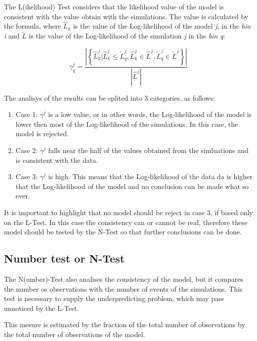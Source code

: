 The L(ikelihood) Test considers that the likelihood value of the model
is consistent with the value obtain with the simulations. The value is
calculated by the formula, where $\widehat{L}_k$ is the value of the
Log-likelihood of the model {\it j}, in the {\it bin} {\it i} and
$\widetilde{L}$ is the value of the Log-likelihood of the simulation
{\it j} in the {\it bin} {\it q}:


\begin{equation}
\gamma^{j}_{q} = \frac{\left| \left\{ \widehat{L}^j_k | \widehat{L}^j_k \leq \widetilde{L}^j_q, \widehat{L}^j_k \in \widehat{L}^j, \widetilde{L}^j_q \in \widetilde{L}^j  \right\} \right|}  {|\widehat{L}^j|}
\end{equation}

The analisys of the results can be splited into 3 categories, as follows:

\begin{enumerate}
\item Case 1: $\gamma^{j}$ is a low value, or in other words, the
  Log-likelihood of the model is lower then most of the Log-likelihood
  of the simulations. In this case, the model is rejected.
\item Case 2: $\gamma^{j}$ falls near the half of the values obtained
  from the simluations and is consistent with the data.
\item Case 3: $\gamma^{j}$ is high. This means that the Log-likelihood
  of the data da is higher that the Log-likelihood of the model and no
  conclusion can be made what so ever.
\end{enumerate}


It is important to highlight that no model should be reject in case 3,
if based only on the L-Test. In this case the consistency can or
cannot be real, therefore these model should be tested by the N-Test
so that further conclusions can be done.

\subsection{Number test or N-Test}
The N(umber)-Test also analises the consistency of the model, but it
compares the number os observations with the number of events of the
simulations. This test is necessary to supply the underpredicting
problem, which may pass unnoticed by the L-Test.

This mesure is estimated by the fraction of the total number of
observations by the total number of observations of the model.

